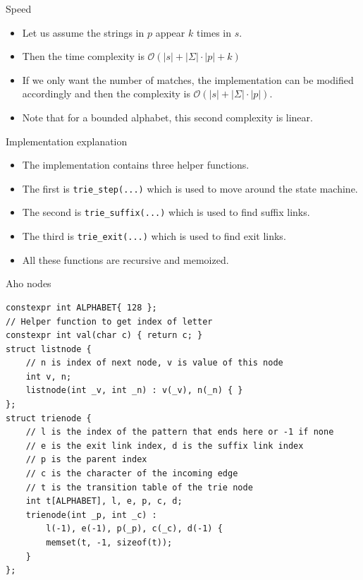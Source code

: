 \documentclass{beamer}
\begin{document}
\begin{frame}[plain]{Speed}
	\begin{itemize}
        \item Let us assume the strings in $p$ appear $k$ times in $s$.
        \item Then the time complexity is $\mathcal{O}(|s| + |\Sigma| \cdot |p| + k)$
        \item If we only want the number of matches, the implementation can be modified accordingly and then the complexity is $\mathcal{O}(|s| + |\Sigma| \cdot |p|)$.
        \item Note that for a bounded alphabet, this second complexity is linear.
    \end{itemize}
\end{frame}

\begin{frame}[plain]{Implementation explanation}
	\begin{itemize}
        \item The implementation contains three helper functions.
        \item The first is \texttt{trie\_step(...)} which is used to move around the state machine.
        \item The second is \texttt{trie\_suffix(...)} which is used to find suffix links.
        \item The third is \texttt{trie\_exit(...)} which is used to find exit links.
        \item All these functions are recursive and memoized.
    \end{itemize}
\end{frame}

\begin{frame}{Aho nodes}
    \scriptsize
    \begin{verbatim}
constexpr int ALPHABET{ 128 };
// Helper function to get index of letter
constexpr int val(char c) { return c; }
struct listnode {
    // n is index of next node, v is value of this node
    int v, n;
    listnode(int _v, int _n) : v(_v), n(_n) { }
};
struct trienode {
    // l is the index of the pattern that ends here or -1 if none
    // e is the exit link index, d is the suffix link index
    // p is the parent index
    // c is the character of the incoming edge
    // t is the transition table of the trie node
    int t[ALPHABET], l, e, p, c, d;
    trienode(int _p, int _c) :
        l(-1), e(-1), p(_p), c(_c), d(-1) {
        memset(t, -1, sizeof(t));
    }
};
    \end{verbatim}
\end{frame}
\end{document}
